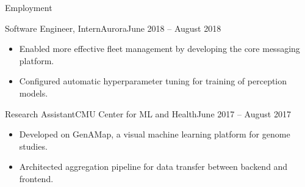 \documentclass[termes]{resume}
\begin{document}
\begin{cvsection}{Employment}
		\begin{cvsubsection}{Software Engineer, Intern}{Aurora}{June 2018 -- August 2018}	
			\begin{itemize}
				\item Enabled more effective fleet management by developing the core messaging platform.
				\item Configured automatic hyperparameter tuning for training of perception models.
			\end{itemize}
		\end{cvsubsection}
		
		\begin{cvsubsection}{Research Assistant}{CMU Center for ML and Health}{June 2017 -- August 2017}
			\begin{itemize}
				\item Developed on GenAMap, a visual machine learning platform for genome studies.
				\item Architected aggregation pipeline for data transfer between backend and frontend.
			\end{itemize}
		\end{cvsubsection}
	\end{cvsection}
	
\end{document}
